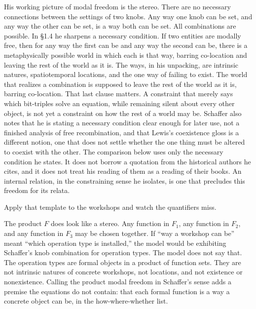 \documentclass[12pt]{article}
\begin{document}
His working picture of modal freedom is the stereo. There are no necessary connections between the settings of two knobs. Any way one knob can be set, and any way the other can be set, is a way both can be set. All combinations are possible. In \S 1.4 he sharpens a necessary condition. If two entities are modally free, then for any way the first can be and any way the second can be, there is a metaphysically possible world in which each is that way, barring co-location and leaving the rest of the world as it is. The ways, in his unpacking, are intrinsic natures, spatiotemporal locations, and the one way of failing to exist. The world that realizes a combination is supposed to leave the rest of the world as it is, barring co-location. That last clause matters. A constraint that merely says which bit-triples solve an equation, while remaining silent about every other object, is not yet a constraint on how the rest of a world may be. Schaffer also notes that he is stating a necessary condition clear enough for later use, not a finished analysis of free recombination, and that Lewis's coexistence gloss is a different notion, one that does not settle whether the one thing must be altered to coexist with the other. The comparison below uses only the necessary condition he states. It does not borrow a quotation from the historical authors he cites, and it does not treat his reading of them as a reading of their books. An internal relation, in the constraining sense he isolates, is one that precludes this freedom for its relata.

Apply that template to the workshops and watch the quantifiers miss.

The product \(F\) does look like a stereo. Any function in \(F_1\), any function in \(F_2\), and any function in \(F_3\) may be chosen together. If ``way a workshop can be'' meant ``which operation type is installed,'' the model would be exhibiting Schaffer's knob combination for operation types. The model does not say that. The operation types are formal objects in a product of function sets. They are not intrinsic natures of concrete workshops, not locations, and not existence or nonexistence. Calling the product modal freedom in Schaffer's sense adds a premise the equations do not contain: that each formal function is a way a concrete object can be, in the how-where-whether list.
\end{document}

